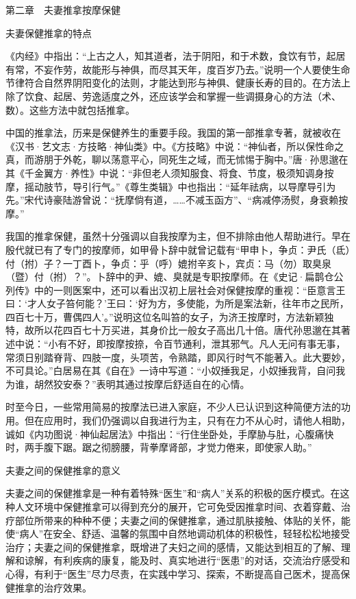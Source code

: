 \documentclass[12pt,UTF8]{ctexbook}
\begin{document}
第二章　夫妻推拿按摩保健


夫妻保健推拿的特点


《内经》中指出：“上古之人，知其道者，法于阴阳，和于术数，食饮有节，起居有常，不妄作劳，故能形与神俱，而尽其天年，度百岁乃去。”说明一个人要使生命节律符合自然界阴阳变化的法则，才能达到形与神俱、健康长寿的目的。在方法上除了饮食、起居、劳逸适度之外，还应该学会和掌握一些调摄身心的方法（术、数）。这些方法中就包括推拿。

中国的推拿法，历来是保健养生的重要手段。我国的第一部推拿专著，就被收在《汉书·艺文志·方技略·神仙类》中。《方技略》中说：“神仙者，所以保性命之真，而游朋于外乾，聊以荡意平心，同死生之域，而无怵惕于胸中。”唐·孙思邈在其《千金翼方·养性》中说：“非但老人须知服食、将食、节度，极须知调身按摩，摇动肢节，导引行气。”《尊生类辑》中也指出：“延年祛病，以导摩导引为先。”宋代诗豪陆游曾说：“抚摩倘有道，……不减玉函方”、“病减停汤熨，身衰赖按摩。”

我国的推拿保健，虽然十分强调以自我按摩为主，但不排除由他人帮助进行。早在殷代就已有了专门的按摩师，如甲骨卜辞中就曾记载有“甲申卜，争贞：尹氏（氐）付（拊）子？一丁酉卜，争贞：乎（呼）媲拊辛亥卜，宾贞：马（勿）取臭泉（暨）付（拊）？”。卜辞中的尹、媲、臭就是专职按摩师。在《史记·扁鹊仓公列传》中的一则医案中，还可以看出汉初上层社会对保健按摩的重视：“臣意言王曰：‘才人女子笞何能？’王曰：‘好为方，多使能，为所是案法新，往年市之民所，四百七十万，曹偶四人’。”说明这位名叫笞的女子，为济王按摩时，方法新颖独特，故所以花四百七十万买进，其身价比一般女子高出几十倍。唐代孙思邈在其著述中说：“小有不好，即按摩按捺，令百节通利，泄其邪气。凡人无问有事无事，常须日别踏脊背、四肢一度，头项苦，令熟踏，即风行时气不能著入。此大要妙，不可具论。”白居易在其《自在》一诗中写道：“小奴捶我足，小奴捶我背，自问我为谁，胡然狡安泰？”表明其通过按摩后舒适自在的心情。

时至今日，一些常用简易的按摩法已进入家庭，不少人已认识到这种简便方法的功用。但在应用时，我们仍强调以自我进行为主，只有在力不从心时，请他人相助，诚如《内功图说·神仙起居法》中指出：“行住坐卧处，手摩胁与肚，心腹痛快时，两手腹下踞。踞之彻膀腰，背拳摩肾部，才觉力倦来，即使家人助。”





夫妻之间的保健推拿的意义


夫妻之间的保健推拿是一种有着特殊“医生”和“病人”关系的积极的医疗模式。在这种人文环境中保健推拿可以得到充分的展开，它可免受因推拿时间、衣着穿戴、治疗部位所带来的种种不便；夫妻之间的保健推拿，通过肌肤接触、体贴的关怀，能使“病人”在安全、舒适、温馨的氛围中自然地调动机体的积极性，轻轻松松地接受治疗；夫妻之间的保健推拿，既增进了夫妇之间的感情，又能达到相互的了解、理解和谅解，有利疾病的康复，能及时、真实地进行“医患”的对话，交流治疗感受和心得，有利于“医生”尽力尽责，在实践中学习、探索，不断提高自己医术，提高保健推拿的治疗效果。
\end{document}
